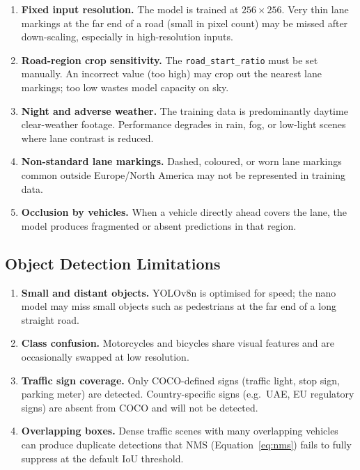 \documentclass[12pt, a4paper]{article}
\begin{document}
\begin{enumerate}
  \item \textbf{Fixed input resolution.}
        The model is trained at $256\times256$. Very thin lane markings
        at the far end of a road (small in pixel count) may be missed after
        down-scaling, especially in high-resolution inputs.

  \item \textbf{Road-region crop sensitivity.}
        The \texttt{road\_start\_ratio} must be set manually. An incorrect
        value (too high) may crop out the nearest lane markings; too low
        wastes model capacity on sky.

  \item \textbf{Night and adverse weather.}
        The training data is predominantly daytime clear-weather footage.
        Performance degrades in rain, fog, or low-light scenes where lane
        contrast is reduced.

  \item \textbf{Non-standard lane markings.}
        Dashed, coloured, or worn lane markings common outside Europe/North
        America may not be represented in training data.

  \item \textbf{Occlusion by vehicles.}
        When a vehicle directly ahead covers the lane, the model produces
        fragmented or absent predictions in that region.
\end{enumerate}

\subsection{Object Detection Limitations}

\begin{enumerate}
  \item \textbf{Small and distant objects.}
        YOLOv8n is optimised for speed; the nano model may miss small
        objects such as pedestrians at the far end of a long straight road.

  \item \textbf{Class confusion.}
        Motorcycles and bicycles share visual features and are occasionally
        swapped at low resolution.

  \item \textbf{Traffic sign coverage.}
        Only COCO-defined signs (traffic light, stop sign, parking meter)
        are detected. Country-specific signs (e.g.\ UAE, EU regulatory signs)
        are absent from COCO and will not be detected.

  \item \textbf{Overlapping boxes.}
        Dense traffic scenes with many overlapping vehicles can produce
        duplicate detections that NMS (Equation~\ref{eq:nms}) fails to
        fully suppress at the default IoU threshold.
\end{enumerate}
\end{document}
